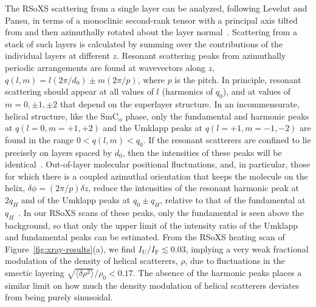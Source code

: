 The RSoXS scattering from a single layer can be analyzed, following Levelut and
Pansu, in terms of a monoclinic second-rank tensor with a principal
axis tilted from and then azimuthally rotated about the layer normal~\cite{levelut1999tensorial,gleeson_resonant_2006,Barois2012review}.   Scattering
from a stack of such layers is calculated by summing over the contributions of the individual layers at different $z$.
Resonant scattering peaks from azimuthally
periodic arrangements are found at wavevectors along $z$, $q(l,m) = l(2\pi/d_0)
\pm m(2\pi/p)$, where $p$ is the pitch.  In principle, resonant
scattering should appear at all values of $l$ (harmonics of $q_0$), and at values
of $m=0,\pm1,\pm2$ that depend on the superlayer structure.  In an incommensurate, helical
structure, like the SmC$_\alpha$ phase, only the fundamental and harmonic peaks at
$q(l=0,m=+1,+2)$ and the Umklapp peaks at
$q(l=+1,m=-1,-2)$ are found in the range $0 < q(l,m) <
q_0$. If the resonant scatterers are confined to lie precisely on layers spaced
by $d_0$, then the intensities of these peaks will be identical~\cite{levelut1999tensorial}.
Out-of-layer molecular positional fluctuations, and, in particular,
those for which there is a coupled azimuthal orientation that keeps the molecule
on the helix, $\delta \phi = (2\pi/p)\delta z$, reduce the intensities of the
resonant harmonic peak
at $2q_H$ and of the Umklapp peaks at $q_0 \pm q_H$, relative to that of the fundamental at
$q_H$~\cite{levelut1999tensorial}. In our RSoXS scans of these peaks, only the
fundamental is seen above the background, so that only the upper limit of
the intensity ratio of the Umklapp and fundamental peaks
can be estimated. From the RSoXS heating scan of
Figure~\ref{fig:xray-results}(a), we find $I_\text{U}/I_\text{F} \lesssim 0.03$, implying a very
weak fractional modulation of the density of helical scatterers, $\rho$, due to fluctuations in the
smectic layering $\sqrt{\langle\delta\rho^2\rangle}/\rho_0 < 0.17$. The absence of the harmonic peaks places a similar limit on how much the density modulation of helical scatterers deviates from being purely sinusoidal.

